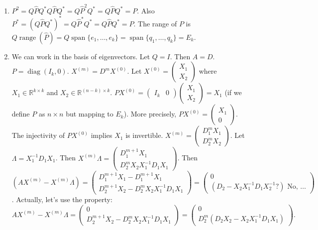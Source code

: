 \begin{solution}
\begin{enumerate}
    \item $P^2 = Q \hat{P} Q^* Q \hat{P} Q^* = Q \hat{P}^2 Q^* = Q \hat{P} Q^* = P$. Also $P^* = (Q \hat{P} Q^*)^* = Q \hat{P}^* Q^* = Q \hat{P} Q^* = P$.
    The range of $P$ is $Q \operatorname{range}(\hat{P}) = Q \operatorname{span}\{e_1, \dots, e_k\} = \operatorname{span}\{q_1, \dots, q_k\} = E_k$.
    \item We can work in the basis of eigenvectors. Let $Q=I$. Then $A=D$. $P = \operatorname{diag}(I_k, 0)$.
    $X^{(m)} = D^m X^{(0)}$. Let $X^{(0)} = \begin{pmatrix} X_1 \\ X_2 \end{pmatrix}$ where $X_1 \in \mathbb{R}^{k \times k}$ and $X_2 \in \mathbb{R}^{(n-k) \times k}$.
    $P X^{(0)} = \begin{pmatrix} I_k & 0 \end{pmatrix} \begin{pmatrix} X_1 \\ X_2 \end{pmatrix} = X_1$ (if we define $P$ as $n \times n$ but mapping to $E_k$). More precisely, $PX^{(0)} = \begin{pmatrix} X_1 \\ 0 \end{pmatrix}$. 
    The injectivity of $PX^{(0)}$ implies $X_1$ is invertible.
    $X^{(m)} = \begin{pmatrix} D_1^m X_1 \\ D_2^m X_2 \end{pmatrix}$.
    Let $\Lambda = X_1^{-1} D_1 X_1$. Then $X^{(m)} \Lambda = \begin{pmatrix} D_1^{m+1} X_1 \\ D_2^m X_2 X_1^{-1} D_1 X_1 \end{pmatrix}$.
    Then $(A X^{(m)} - X^{(m)} \Lambda) = \begin{pmatrix} D_1^{m+1} X_1 - D_1^{m+1} X_1 \\ D_2^{m+1} X_2 - D_2^m X_2 X_1^{-1} D_1 X_1 \end{pmatrix} = \begin{pmatrix} 0 \\ (D_2 - X_2 X_1^{-1} D_1 X_2^{-1}?) \text{ No, } \dots \end{pmatrix}$.
    Actually, let's use the property:
    \[
    AX^{(m)} - X^{(m)} \Lambda = \begin{pmatrix} 0 \\ D_2^{m+1} X_2 - D_2^m X_2 X_1^{-1} D_1 X_1 \end{pmatrix} = \begin{pmatrix} 0 \\ D_2^m (D_2 X_2 - X_2 X_1^{-1} D_1 X_1) \end{pmatrix}.
\]
\end{enumerate}
\end{solution}
